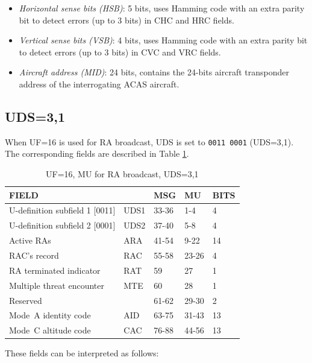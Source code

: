 \begin{itemize}
  \item \emph{Horizontal sense bits (HSB)}: 5 bits, uses Hamming code with an extra parity bit to detect errors (up to 3 bits) in CHC and HRC fields.

  \item \emph{Vertical sense bits (VSB)}: 4 bits, uses Hamming code with an extra parity bit to detect errors (up to 3 bits) in CVC and VRC fields.

  \item \emph{Aircraft address (MID)}: 24 bits, contains the 24-bits aircraft transponder address of the interrogating ACAS aircraft.

\end{itemize}



\subsection{UDS=3,1} \label{sec:acas_ra}

When UF=16 is used for RA broadcast, UDS is set to \texttt{0011 0001} (UDS=3,1). The corresponding fields are described in Table \ref{tb:acas_mu_uds31}.

\begin{table}[ht]
\caption{UF=16, MU for RA broadcast, UDS=3,1}
\label{tb:acas_mu_uds31}
\begin{tabular}{|l|l|l|l|l|}
\hline
\textbf{FIELD} & \textbf{} & \textbf{MSG} & \textbf{MU} & \textbf{BITS} \\ \hline
U-definition subfield 1 [0011] & UDS1 & 33-36 & 1-4 & 4 \\ \hline
U-definition subfield 2 [0001] & UDS2 & 37-40 & 5-8 & 4 \\ \hline
Active RAs & ARA & 41-54 & 9-22 & 14 \\ \hline
RAC's record & RAC & 55-58 & 23-26 & 4 \\ \hline
RA terminated indicator & RAT & 59 & 27 & 1 \\ \hline
Multiple threat encounter & MTE & 60 & 28 & 1 \\ \hline
Reserved &  & 61-62 & 29-30 & 2 \\ \hline
Mode~A identity code & AID & 63-75 & 31-43 & 13 \\ \hline
Mode~C altitude code & CAC & 76-88 & 44-56 & 13 \\ \hline
\end{tabular}
\end{table}

These fields can be interpreted as follows:

